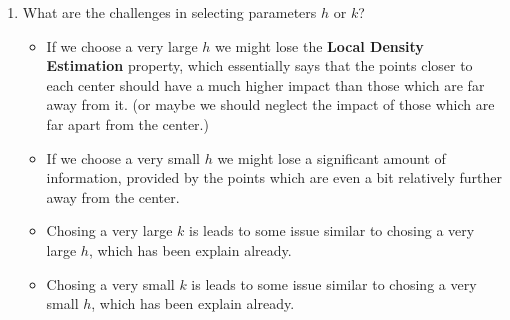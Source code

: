 \documentclass[a4paper,12pt]{article}
\begin{document}
\begin{enumerate}[label=(\alph*)]
    \item What are the challenges in selecting parameters $h$ or $k$?
    \begin{itemize}
        \item If we choose a very large $h$ we might lose the \textbf{Local Density Estimation} property, which essentially says that the points closer to each center should have a much higher impact than those which are far away from it. (or maybe we should neglect the impact of those which are far apart from the center.)
        \item If we choose a very small $h$ we might lose a significant amount of information, provided by the points which are even a bit relatively further away from the center.
        \item Chosing a very large $k$ is leads to some issue similar to chosing a very large $h$, which has been explain already.
        \item Chosing a very small $k$ is leads to some issue similar to chosing a very small $h$, which has been explain already.
    \end{itemize}
\end{enumerate}
\end{document}
